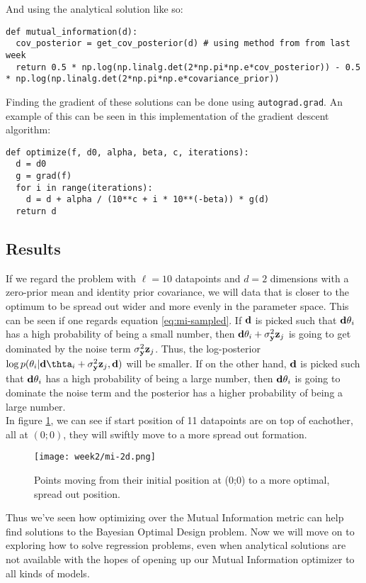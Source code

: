 And using the analytical solution like so:
\begin{verbatim}
def mutual_information(d):
  cov_posterior = get_cov_posterior(d) # using method from from last week
  return 0.5 * np.log(np.linalg.det(2*np.pi*np.e*cov_posterior)) - 0.5 * np.log(np.linalg.det(2*np.pi*np.e*covariance_prior))
\end{verbatim}

Finding the gradient of these solutions can be done using \texttt{autograd.grad}. 
An example of this can be seen in this implementation of the gradient descent algorithm:
\begin{verbatim}
def optimize(f, d0, alpha, beta, c, iterations):
  d = d0
  g = grad(f)
  for i in range(iterations):
    d = d + alpha / (10**c + i * 10**(-beta)) * g(d)
  return d
\end{verbatim}

\subsection{Results}
If we regard the problem with $\ell = 10$ datapoints and $d=2$ dimensions with a zero-prior mean and identity prior covariance, 
we will data that is closer to the optimum to be spread out wider and more evenly in the parameter space.
This can be seen if one regards equation \ref{eq:mi-sampled}. 
If $\mathbf{d}$ is picked such that $\mathbf{d}\theta_i$ has a high probability of being a small number, then
$\mathbf{d}\theta_i + \sigma^2_{\mathbf{y}}\mathbf{z}_j$ is going to get dominated by the noise term $\sigma^2_{\mathbf{y}}\mathbf{z}_j$.
Thus, the log-posterior $\log p(\theta_i | \B{d}\thta_i + \sigma^2_\B{y}\B{z}_j, \B{d})$ will be smaller.
If on the other hand, $\mathbf{d}$ is picked such that $\mathbf{d}\theta_i$ has a high probability of being a large number, then $\mathbf{d}\theta_i$ is going to dominate the noise term
and the posterior has a higher probability of being a large number.\\
In figure \ref{fig:mi-2d}, we can see if start position of 11 datapoints are on top of eachother, all at $(0;0)$, they will swiftly move to a more spread out formation.
\begin{figure}
  \centering
  \texttt{[image: week2/mi-2d.png]}
  \caption{Points moving from their initial position at (0;0) to a more optimal, spread out position.}
  \label{fig:mi-2d}
\end{figure}
Thus we've seen how optimizing over the Mutual Information metric can help find solutions to the Bayesian Optimal Design problem.
Now we will move on to exploring how to solve regression problems, even when analytical solutions are not available with the hopes of opening up our Mutual Information optimizer to all kinds of models.
